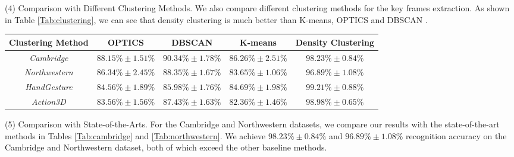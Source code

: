 \documentclass[5p]{elsarticle}
\begin{document}
\noindent (4) Comparison with Different Clustering Methods.
We also compare different clustering methods for the key frames extraction.
As shown in Table \ref{Tab:clustering}, we can see that density clustering is much better than K-means, OPTICS \cite{ankerst1999optics} and DBSCAN \cite{ester1996density}.

\begin{table*}[!htbp]
	\centering
	\caption{Comparison with different clustering methods on the Cambridge, Northwestern, HandGesture and Action3D datasets.}
\begin{tabular}{c|c|c|c|c} \hline
		Clustering Method     & OPTICS \cite{ankerst1999optics} & DBSCAN \cite{ester1996density} & K-means  & Density Clustering \cite{rodriguez2014clustering} \\ \hline
		\emph{Cambridge}      & $88.15\% \pm 1.51\%$ & $90.34\% \pm 1.78\%$ & $86.26\% \pm 2.51\%$ & $98.23\% \pm 0.84\% $    \\ \hline
		\emph{Northwestern} & $86.34\% \pm 2.45\%$ & $88.35\% \pm 1.67\%$ & $83.65\% \pm 1.06\%$ & $96.89\% \pm 1.08\% $     \\ \hline
		\emph{HandGesture}  & $84.56\% \pm 1.89\%$ & $85.98\% \pm 1.76\%$ & $84.69\% \pm 1.98\%$ & $99.21\% \pm 0.88\% $    \\ \hline
		\emph{Action3D}        & $83.56\% \pm 1.56\%$ & $87.43\% \pm 1.63\%$& $82.36\% \pm 1.46\%$ & $98.98\% \pm 0.65\% $    \\ \hline
	\end{tabular}
	\label{Tab:clustering}
\end{table*}


\noindent (5) Comparison with State-of-the-Arts.
For the Cambridge and Northwestern datasets, we compare our results with the state-of-the-art methods in Tables \ref{Tab:cambridge} and \ref{Tab:northwestern}.
We achieve $98.23\% \pm 0.84\%$ and $96.89\% \pm 1.08\%$ recognition accuracy on the Cambridge and Northwestern dataset, both of which exceed the other baseline methods.
\end{document}
